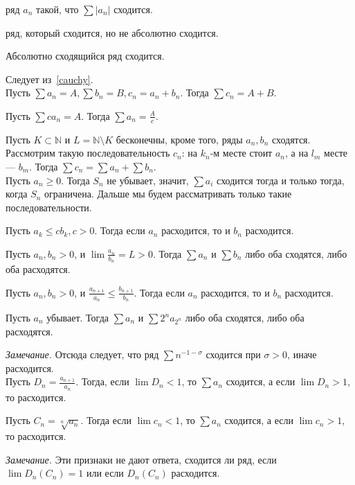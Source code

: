 \documentclass[12pt,a4paper]{article}
\begin{document}
 ряд $a_n$ такой, что $\sum|a_n|$ сходится.

 ряд, который сходится, но не абсолютно сходится.

\lemma Абсолютно сходящийся ряд сходится.

\proof Следует из~\ref{cauchy}.\QEDA\\

\lemma Пусть $\sum a_n=A,\sum b_n=B,c_n=a_n+b_n$. Тогда $\sum c_n=A+B$.

\lemma Пусть $\sum ca_n=A$. Тогда $\sum a_n=\frac{A}{c}$.

\lemma Пусть $K\subset \mathbb N$ и $L=\mathbb N\setminus K$ бесконечны, кроме того, ряды $a_n,b_n$ сходятся. Рассмотрим такую последовательность $c_n$: на $k_n$-м месте стоит $a_n$, а на $l_m$ месте --- $b_m$. Тогда $\sum c_n=\sum a_n+\sum b_n$.\\

Пусть $a_n\geq 0$. Тогда $S_n$ не убывает, значит, $\sum a_i$ сходится тогда и только тогда, когда $S_n$ ограничена. Дальше мы будем рассматривать только такие последовательности.

\lemma Пусть $a_k\leq cb_k,c>0$. Тогда если $a_n$ расходится, то и $b_n$ расходится.

\lemma Пусть $a_n,b_n>0$, и $\lim \frac{a_n}{b_n}=L>0$. Тогда $\sum a_n$ и $\sum b_n$ либо оба сходятся, либо оба расходятся.

\lemma Пусть $a_n,b_n>0$, и $\frac{a_{n+1}}{a_n}\leq \frac{b_{n+1}}{b_n}$. Тогда если $a_n$ расходится, то и $b_n$ расходится.

\lemma Пусть $a_n$ убывает. Тогда $\sum a_n$ и $\sum 2^na_{2^n}$ либо оба сходятся, либо оба расходятся.

\textit{Замечание.} Отсюда следует, что ряд $\sum n^{-1-\sigma}$ сходится при $\sigma>0$, иначе расходится.\\

 Пусть $D_n=\frac{a_{n+1}}{a_n}$. Тогда, если $\lim D_n<1$, то $\sum a_n$ сходится, а если $\lim D_n>1$, то расходится.\label{dalamber}

 Пусть $C_n=\sqrt[n]{a_n}$. Тогда если $\lim c_n<1$, то $\sum a_n$ сходится, а если $\lim c_n> 1$, то расходится.

\textit{Замечание.} Эти признаки не дают ответа, сходится ли ряд, если $\lim D_n(C_n)=1$ или если $D_n(C_n)$ расходится.\\

\end{document}
